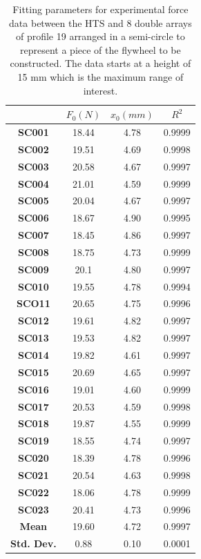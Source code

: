 \begin{table}[!t]
  \centering
  \caption{Fitting parameters for experimental force data between the HTS and 8 double arrays of profile 19 arranged in a semi-circle to represent a piece of the flywheel to be constructed. The data starts at a height of 15 mm which is the maximum range of interest.}
    \begin{tabular}{cccc}
    \hline
    & \textbf{$F_0(N)$} & \textbf{$x_0(mm)$} & \textbf{$R^2$} \\
    \hline
    \textbf{SC001}& 18.44& 4.78& 0.9999 \\
    \textbf{SC002}& 19.51& 4.69 & 0.9998 \\
    \textbf{SC003}& 20.58& 4.67 & 0.9997 \\
    \textbf{SC004}& 21.01& 4.59 & 0.9999 \\
    \textbf{SC005}& 20.04& 4.67 & 0.9997 \\
    \textbf{SC006}& 18.67& 4.90 & 0.9995 \\
    \textbf{SC007}& 18.45& 4.86 & 0.9997 \\
    \textbf{SC008}& 18.75& 4.73 & 0.9999 \\
    \textbf{SC009}& 20.1 & 4.80 & 0.9997 \\
    \textbf{SC010}& 19.55& 4.78 & 0.9994 \\
    \textbf{SCO11}& 20.65& 4.75 & 0.9996 \\
    \textbf{SC012}& 19.61& 4.82 & 0.9997 \\
    \textbf{SC013}& 19.53& 4.82 & 0.9997 \\
    \textbf{SC014}& 19.82& 4.61 & 0.9997 \\
    \textbf{SC015}& 20.69& 4.65 & 0.9997 \\
    \textbf{SC016}& 19.01& 4.60 & 0.9999 \\
    \textbf{SC017}& 20.53& 4.59 & 0.9998 \\
    \textbf{SC018}& 19.87& 4.55 & 0.9999 \\
    \textbf{SC019}& 18.55& 4.74 & 0.9997 \\
    \textbf{SC020}& 18.39& 4.78 & 0.9996 \\
    \textbf{SC021}& 20.54& 4.63 & 0.9998 \\
    \textbf{SC022}& 18.06& 4.78 & 0.9999 \\
    \textbf{SC023}& 20.41& 4.73 & 0.9996 \\
    \textbf{ Mean}&	19.60&4.72	&0.9997\\
	\textbf{Std. Dev.}	&0.88	&0.10	&0.0001\\
    \hline
    \end{tabular}%
  \label{tab_expfitparm}%
\end{table}%

